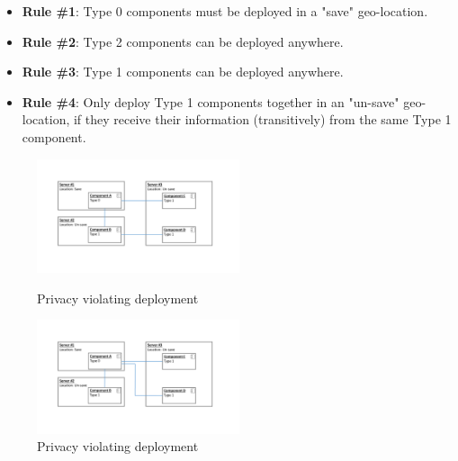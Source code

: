 \begin{itemize}
	\label{enum:deployment_rules}
	\setlength\itemsep{0em}
	\item \textbf{Rule \#1}: Type 0 components must be deployed in a "save" geo-location.
	\item \textbf{Rule \#2}: Type 2 components can be deployed anywhere.
	\item \textbf{Rule \#3}: Type 1 components can be deployed anywhere.
	\item \textbf{Rule \#4}: Only deploy Type 1 components together in an "un-save" geo-location, if they receive their information (transitively) from the same Type 1 component.
\end{itemize}



\begin{figure}
	\begin{center}
		\includegraphics[trim = 35mm 45mm 40mm 30mm, clip, width=0.53\textwidth]{graphs/deployment_example_1}
	\end{center}
	\caption{Privacy violating deployment}
	\label{fig:example_depl:1}
	\begin{center}
		\includegraphics[trim = 35mm 45mm 40mm 30mm, clip, width=0.53\textwidth]{graphs/deployment_example_2}
	\end{center}
	\caption{Privacy violating deployment}
	\label{fig:example_depl:2}
\end{figure}

